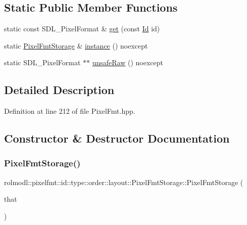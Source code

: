 \subsection*{Static Public Member Functions}
\begin{DoxyCompactItemize}
\item 
static const S\+D\+L\+\_\+\+Pixel\+Format \& \mbox{\hyperlink{classrolmodl_1_1pixelfmt_1_1id_1_1type_1_1order_1_1layout_1_1_pixel_fmt_storage_a2c698788e080a1729f51c2f25a0211a0}{get}} (const \mbox{\hyperlink{namespacerolmodl_1_1pixelfmt_a96282713e4465ba9211c8fd3a702b52b}{Id}} id)
\item 
static \mbox{\hyperlink{classrolmodl_1_1pixelfmt_1_1id_1_1type_1_1order_1_1layout_1_1_pixel_fmt_storage}{Pixel\+Fmt\+Storage}} \& \mbox{\hyperlink{classrolmodl_1_1pixelfmt_1_1id_1_1type_1_1order_1_1layout_1_1_pixel_fmt_storage_a7dafaf6d88c10a21432819d6069224d5}{instance}} () noexcept
\item 
static S\+D\+L\+\_\+\+Pixel\+Format $\ast$$\ast$ \mbox{\hyperlink{classrolmodl_1_1pixelfmt_1_1id_1_1type_1_1order_1_1layout_1_1_pixel_fmt_storage_a5b6727f353410393d330a313bf26ffaf}{unsafe\+Raw}} () noexcept
\end{DoxyCompactItemize}


\subsection{Detailed Description}


Definition at line 212 of file Pixel\+Fmt.\+hpp.



\subsection{Constructor \& Destructor Documentation}
\mbox{\label{classrolmodl_1_1pixelfmt_1_1id_1_1type_1_1order_1_1layout_1_1_pixel_fmt_storage_adc3a76ccaf5a072fc0d17ac6c9f2f285}} 
\subsubsection{\texorpdfstring{PixelFmtStorage()}{PixelFmtStorage()}\hspace{0.1cm}{\footnotesize\ttfamily [1/2]}}
{\footnotesize\ttfamily rolmodl\+::pixelfmt\+::id\+::type\+::order\+::layout\+::\+Pixel\+Fmt\+Storage\+::\+Pixel\+Fmt\+Storage (\begin{DoxyParamCaption}\item[{const \mbox{\hyperlink{classrolmodl_1_1pixelfmt_1_1id_1_1type_1_1order_1_1layout_1_1_pixel_fmt_storage}{Pixel\+Fmt\+Storage}} \&}]{that }\end{DoxyParamCaption})\hspace{0.3cm}{\ttfamily [delete]}}

